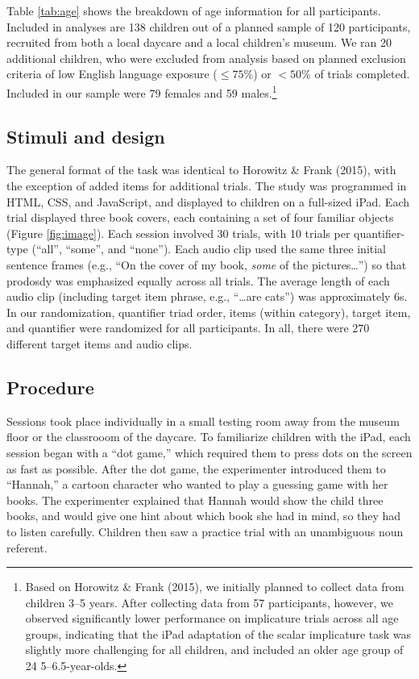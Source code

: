 \documentclass[10pt, letterpaper]{article}
\begin{document}
Table \ref{tab:age} shows the breakdown of age information for all
participants. Included in analyses are 138 children out of a planned
sample of 120 participants, recruited from both a local daycare and a
local children's museum. We ran 20 additional children, who were
excluded from analysis based on planned exclusion criteria of low
English language exposure (\(\leq 75\%\)) or \(<50\%\) of trials
completed. Included in our sample were 79 females and 59
males.\footnote{Based on Horowitz \& Frank (2015), we initially planned
  to collect data from children 3--5 years. After collecting data from
  57 participants, however, we observed significantly lower performance
  on implicature trials across all age groups, indicating that the iPad
  adaptation of the scalar implicature task was slightly more
  challenging for all children, and included an older age group of 24
  5--6.5-year-olds.}

\subsection{Stimuli and design}\label{stimuli-and-design}

The general format of the task was identical to Horowitz \& Frank
(2015), with the exception of added items for additional trials. The
study was programmed in HTML, CSS, and JavaScript, and displayed to
children on a full-sized iPad. Each trial displayed three book covers,
each containing a set of four familiar objects (Figure \ref{fig:image}).
Each session involved 30 trials, with 10 trials per quantifier-type
(``all'', ``some'', and ``none''). Each audio clip used the same three
initial sentence frames (e.g., ``On the cover of my book, \emph{some} of
the pictures\ldots{}'') so that prodosdy was emphasized equally across
all trials. The average length of each audio clip (including target item
phrase, e.g., ``\ldots{}are cats'') was approximately 6s. In our
randomization, quantifier triad order, items (within category), target
item, and quantifier were randomized for all participants. In all, there
were 270 different target items and audio clips.

\subsection{Procedure}\label{procedure}

Sessions took place individually in a small testing room away from the
museum floor or the classrooom of the daycare. To familiarize children
with the iPad, each session began with a ``dot game,'' which required
them to press dots on the screen as fast as possible. After the dot
game, the experimenter introduced them to ``Hannah,'' a cartoon
character who wanted to play a guessing game with her books. The
experimenter explained that Hannah would show the child three books, and
would give one hint about which book she had in mind, so they had to
listen carefully. Children then saw a practice trial with an unambiguous
noun referent.
\end{document}
